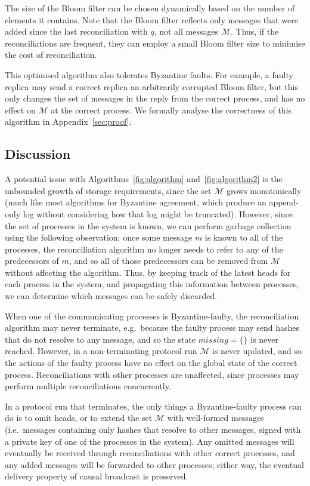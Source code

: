 \documentclass[a4paper,anonymous,USenglish]{lipics-v2019}
\begin{document}
The size of the Bloom filter can be chosen dynamically based on the number of elements it contains.
Note that the Bloom filter reflects only messages that were added since the last reconciliation with $q$, not all messages $\mathcal{M}$.
Thus, if the reconciliations are frequent, they can employ a small Bloom filter size to minimise the cost of reconciliation.

This optimised algorithm also tolerates Byzantine faults.
For example, a faulty replica may send a correct replica an arbitrarily corrupted Bloom filter, but this only changes the set of messages in the reply from the correct process, and has no effect on $\mathcal{M}$ at the correct process.
We formally analyse the correctness of this algorithm in Appendix~\ref{sec:proof}.

\subsection{Discussion}

A potential issue with Algorithms~\ref{fig:algorithm} and~\ref{fig:algorithm2} is the unbounded growth of storage requirements, since the set $\mathcal{M}$ grows monotonically (much like most algorithms for Byzantine agreement, which produce an append-only log without considering how that log might be truncated).
However, since the set of processes in the system is known, we can perform garbage collection using the following observation: once some message $m$ is known to all of the processes, the reconciliation algorithm no longer needs to refer to any of the predecessors of $m$, and so all of those predecessors can be removed from $\mathcal{M}$ without affecting the algorithm.
Thus, by keeping track of the latest heads for each process in the system, and propagating this information between processes, we can determine which messages can be safely discarded.

When one of the communicating processes is Byzantine-faulty, the reconciliation algorithm may never terminate, e.g.\ because the faulty process may send hashes that do not resolve to any message, and so the state $\mathit{missing} = \{\}$ is never reached.
However, in a non-terminating protocol run $\mathcal{M}$ is never updated, and so the actions of the faulty process have no effect on the global state of the correct process.
Reconciliations with other processes are unaffected, since processes may perform multiple reconciliations concurrently.

In a protocol run that terminates, the only things a Byzantine-faulty process can do is to omit heads, or to extend the set $\mathcal{M}$ with well-formed messages (i.e.\ messages containing only hashes that resolve to other messages, signed with a private key of one of the processes in the system).
Any omitted messages will eventually be received through reconciliations with other correct processes, and any added messages will be forwarded to other processes; either way, the eventual delivery property of causal broadcast is preserved.
\end{document}
